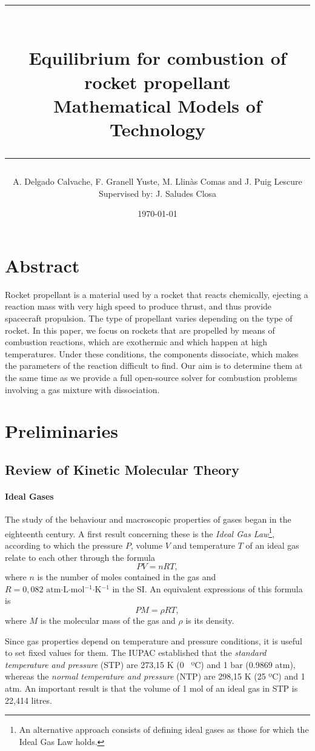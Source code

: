 \documentclass[a4paper,10pt]{article}
\title{
    \rule{14cm}{0.5mm}\\
    Equilibrium for combustion of rocket propellant\\[0.5cm]
    \large{Mathematical Models of Technology}
    \rule{14cm}{0.5mm}
}
\author{\normalsize A. Delgado Calvache, F. Granell Yuste, M. Llinàs Comas and J. Puig Lescure\\{\small Supervised by: J. Saludes Closa}}
\date{\normalsize \today}
\theoremstyle{plain}
\theoremstyle{definition}
\theoremstyle{remark}
\begin{document}
\maketitle
\tableofcontents
\section*{Abstract}
Rocket propellant is a material used by a rocket that reacts chemically, ejecting a reaction mass with very high speed to produce thrust, and thus provide spacecraft propulsion. The type of propellant varies depending on the type of rocket. In this paper, we focus on rockets that are propelled by means of combustion reactions, which are exothermic and which happen at high temperatures. Under these conditions, the components dissociate, which makes the parameters of the reaction difficult to find. Our aim is to determine them at the same time as we provide a full open-source solver for combustion problems involving a gas mixture with dissociation.
\section{Preliminaries}
\subsection{Review of Kinetic Molecular Theory}
\paragraph{Ideal Gases}The study of the behaviour and macroscopic properties of gases began in the eighteenth century. A first result concerning these is the \textit{Ideal Gas Law}\footnote{An alternative approach consists of defining ideal gases as those for which the Ideal Gas Law holds.}, according to which the pressure $P$, volume $V$ and temperature $T$ of an ideal gas relate to each other through the formula
\begin{equation}
PV=nRT,
\end{equation}
where $n$ is the number of moles contained in the gas and $R=0,082 \text{ atm·L·mol$^{-1}$·K$^{-1}$}$ in the SI. An equivalent expressions of this formula is
\begin{equation}
PM=\rho RT,
\end{equation}
where $M$ is the molecular mass of the gas and $\rho$ is its density.

Since gas properties depend on temperature and pressure conditions, it is useful to set fixed values for them. The IUPAC established that the \textit{standard temperature and pressure} (STP) are 273,15 K (0 ~ºC) and 1 bar (0.9869 atm), whereas the \textit{normal temperature and pressure} (NTP) are 298,15 K (25 ºC) and 1 atm. An important result is that the volume of 1 mol of an ideal gas in STP is 22,414 litres.
\end{document}
